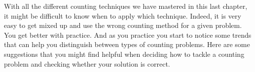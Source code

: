 \documentclass[12pt]{article}
\begin{document}
\begin{activity}
\begin{questions}
\end{questions}
\end{activity}

With all the different counting techniques we have mastered in this last chapter, it might be difficult to know when to apply which technique.  Indeed, it is very easy to get mixed up and use the wrong counting method for a given problem.  You get better with practice.  And as you practice you start to notice some trends that can help you distinguish between types of counting problems.  Here are some suggestions that you might find helpful when deciding how to tackle a counting problem and checking whether your solution is correct.
\end{document}

